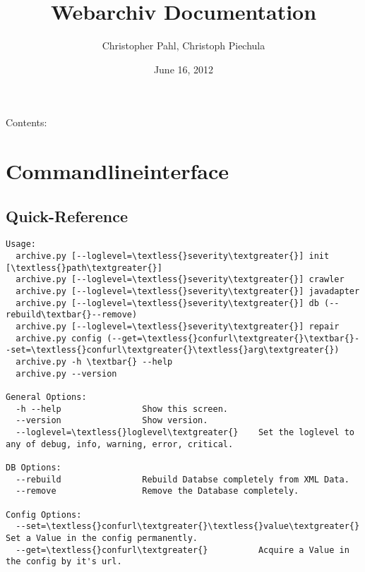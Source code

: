 \documentclass[letterpaper,10pt,english]{sphinxmanual}
\title{Webarchiv Documentation}
\date{June 16, 2012}
\author{Christopher Pahl, Christoph Piechula}
\begin{document}
\maketitle
\tableofcontents
{}\label{index::doc}


Contents:


\chapter{Commandlineinterface}
\label{cli:commandlineinterface}\label{cli::doc}\label{cli:welcome-to-webarchiv-s-documentation}

\section{Quick-Reference}
\label{cli:quick-reference}
\begin{Verbatim}[commandchars=\\\{\}]
Usage:
  archive.py [--loglevel=\textless{}severity\textgreater{}] init [\textless{}path\textgreater{}]
  archive.py [--loglevel=\textless{}severity\textgreater{}] crawler
  archive.py [--loglevel=\textless{}severity\textgreater{}] javadapter
  archive.py [--loglevel=\textless{}severity\textgreater{}] db (--rebuild\textbar{}--remove)
  archive.py [--loglevel=\textless{}severity\textgreater{}] repair
  archive.py config (--get=\textless{}confurl\textgreater{}\textbar{}--set=\textless{}confurl\textgreater{}\textless{}arg\textgreater{})
  archive.py -h \textbar{} --help
  archive.py --version

General Options:
  -h --help                Show this screen.
  --version                Show version.
  --loglevel=\textless{}loglevel\textgreater{}    Set the loglevel to any of debug, info, warning, error, critical.

DB Options:
  --rebuild                Rebuild Databse completely from XML Data.
  --remove                 Remove the Database completely.

Config Options:
  --set=\textless{}confurl\textgreater{}\textless{}value\textgreater{}   Set a Value in the config permanently.
  --get=\textless{}confurl\textgreater{}          Acquire a Value in the config by it's url.
\end{Verbatim}
\end{document}
